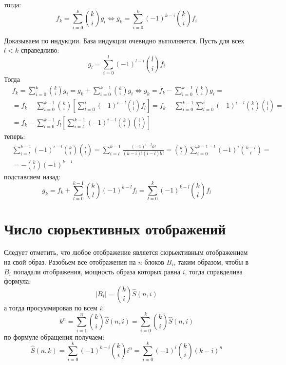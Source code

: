 тогда:
\begin{equation}
	f_k = \sum_{i=0}^k\binom{k}{i}g_i \Leftrightarrow g_k = \sum_{i=0}^k \left(-1\right)^{k-i}\binom{k}{i}f_i
\end{equation}
\begin{Proof}
Доказываем по индукции. База индукции очевидно выполняется. Пусть для всех $l < k$ справедливо:
\[
	g_l = \sum_{i=0}^l\left(-1\right)^{l-i}\binom{l}{i}f_i
\]
Тогда
\[
	\begin{split}
		& f_k = \sum_{i=0}^k\binom{k}{i}g_i = g_k + \sum_{i=0}^{k-1} \binom{k}{i}g_i \Leftrightarrow g_k = f_k - \sum_{i=0}^{k-1}\binom{k}{i}g_i = \\
		& = f_k - \sum_{i=0}^{k-1}\binom{k}{i}\left[\sum_{l=0}^i \left(-1\right)^{i-l}\binom{i}{l}f_l\right] = f_k - \sum_{i=0}^{k-1}\sum_{l=0}^i \left(-1\right)^{i-l} \binom{k}{i}\binom{i}{l} = \\
		& = f_k - \sum_{l=0}^{k-1}f_l \left[\sum_{i=l}^{k-1}\left(-1\right)^{i-l}\binom{k}{i}\binom{i}{l}\right]
	\end{split}
\]
теперь:
\[
	\begin{split}
		& \sum_{i=l}^{k-1}\left(-1\right)^{i-l}\binom{k}{i}\binom{i}{l} = \sum_{i=l}^{k-1}\frac{\left(-1\right)^{i-l}k!}{\left(k-i\right)!\left(i-l\right)!l!} = \binom{k}{l}\sum_{i=0}^{k-1-l}\left(-1\right)^i\binom{k-l}{i} = \\
		& = - \binom{k}{l}\left(-1\right)^{k-l}
	\end{split}
\]
подставляем назад:
\[
	g_k = f_k + \sum_{l=0}^{k-1} \binom{k}{l}\left(-1\right)^{k-l}f_l = \sum_{l=0}^k \left(-1\right)^{k-l}\binom{k}{l}f_l
\]
\end{Proof}

\section{Число сюрьективных отображений}

Следует отметить, что любое отображение является сюрьективным отображением на свой образ. Разобьем все отображения на $n$ блоков $B_i$, таким образом, чтобы в $B_i$ попадали отображения, мощность образа которых равна $i$, тогда справделива формула:
\begin{equation}
\left|B_i\right| = \binom{k}{i}\hat S\left(n,i\right)
\end{equation}
а тогда просуммировав по всем $i$:
\begin{equation}
k^n = \sum_{i=1}^n\binom{k}{i}\hat S\left(n,i\right) = \sum_{i=0}^k\binom{k}{i} \hat S\left(n,i\right)
\end{equation}
по формуле обращения получаем:
\begin{equation}
	\hat S\left(n,k\right) = \sum_{i=0}^k\left(-1\right)^{k-i}\binom{k}{i}i^n = \sum_{i=0}^k\left(-1\right)^i\binom{k}{i}\left(k-i\right)^n
\end{equation}
